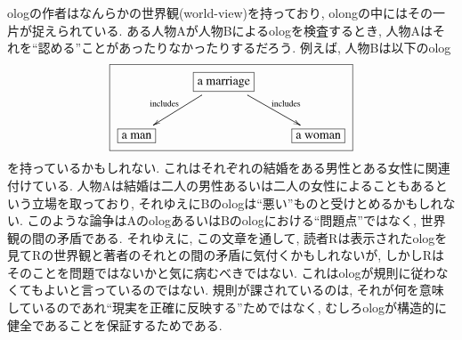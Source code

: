 \begin{warning}\label{warn:worldview}


ologの作者はなんらかの世界観(world-view)を持っており, olongの中にはその一片が捉えられている. ある人物Aが人物Bによるologを検査するとき, 人物Aはそれを``認める''ことがあったりなかったりするだろう. 例えば, 人物Bは以下のolog$$\fbox{\xymatrix{&\fbox{a marriage}\LA{dr}{ includes}\LAL{dl}{includes }\\\fbox{a man}&&\fbox{a woman}}}$$を持っているかもしれない. これはそれぞれの結婚をある男性とある女性に関連付けている. 人物Aは結婚は二人の男性あるいは二人の女性によることもあるという立場を取っており, それゆえにBのologは``悪い''ものと受けとめるかもしれない. このような論争はAのologあるいはBのologにおける``問題点''ではなく, 世界観の間の矛盾である. それゆえに, この文章を通して, 読者Rは表示されたologを見てRの世界観と著者のそれとの間の矛盾に気付くかもしれないが, しかしRはそのことを問題ではないかと気に病むべきではない. これはologが規則に従わなくてもよいと言っているのではない. 規則が課されているのは, それが何を意味しているのであれ``現実を正確に反映する''ためではなく, むしろologが構造的に健全であることを保証するためである.



\end{warning}
